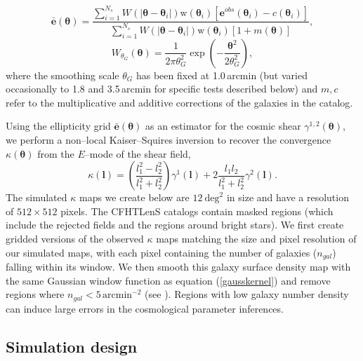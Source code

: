 \documentclass[reprint,aps,prd,superscriptaddress,showkeys,showpacs]{revtex4-1}
\begin{document}
\begin{equation}
\bar{\mathbf{e}}(\pmb{\theta}) = \frac{\sum_{i=1}^{N_s} W(\vert\pmb{\theta}-\pmb{\theta}_i\vert)\mathrm{w}(\pmb{\theta}_i)[\mathbf{e}^{obs}(\pmb{\theta}_i)-c(\pmb{\theta}_i)]}{\sum_{i=1}^{N_s}W(\vert\pmb{\theta}-\pmb{\theta}_i\vert)\mathrm{w}(\pmb{\theta}_i)[1+m(\pmb{\theta})]},
\end{equation} 
\begin{equation}
\label{gausskernel}
W_{\theta_G}(\pmb{\theta}) = \frac{1}{2\pi\theta_G^2}\exp{\left(-\frac{\pmb{\theta}^2}{2\theta_G^2}\right)},
\end{equation}
%
where the smoothing scale $\theta_G$ has been fixed at 1.0\,arcmin
(but varied occasionally to 1.8 and 3.5\,arcmin for specific tests
described below) and $m,c$ refer to the multiplicative and additive
corrections of the galaxies in the catalog. 


Using the ellipticity grid $\bar{\mathbf{e}}(\pmb{\theta})$ as an
estimator for the cosmic shear $\gamma^{1,2}(\pmb{\theta})$, we
perform a non--local Kaiser--Squires inversion \citep{KS} to recover
the convergence $\kappa(\pmb{\theta})$ from the $E$--mode of the shear
field,
%
\begin{equation}
\kappa(\mathbf{l}) = \left(\frac{l_1^2-l_2^2}{l_1^2+l_2^2}\right)\gamma^1(\mathbf{l}) + 2\frac{l_1l_2}{l_1^2+l_2^2}\gamma^2(\mathbf{l}).
\end{equation}
%
The simulated $\kappa$ maps we create below are $12~\mathrm{deg}^2$ in
size and have a resolution of $512\times512$ pixels. The CFHTLenS
catalogs contain masked regions (which include the rejected fields and
the regions around bright stars). We first create gridded versions of
the observed $\kappa$ maps matching the size and pixel resolution of
our simulated maps, with each pixel containing the number of galaxies
($n_{gal}$) falling within its window.  
We then smooth this galaxy surface density map with the same Gaussian
window function as equation (\ref{gausskernel}) and remove regions
where $n_{gal} < 5 \,\mathrm{arcmin}^{−2}$ (see
\citep{CFHTMasato}). Regions with low galaxy number density can induce
large errors in the cosmological parameter inferences. 

\subsection{Simulation design}
\end{document}
